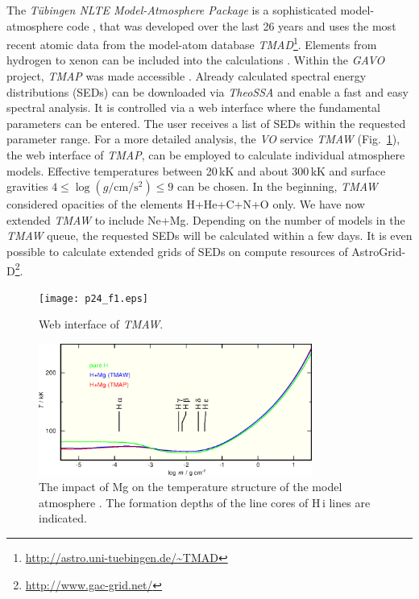 \documentclass[11pt,twoside]{article}
\begin{document}
The \emph{T\"ubingen NLTE Model-Atmosphere Package} 
\citep[\emph{TMAP},][]{werneretal2003, rauchdeetjen2003} is a 
sophisticated model-atmosphere code 
\citep[e.g\@.][]{rauchetal2007},
that was developed over the last 26 years 
and uses the most recent atomic data from the model-atom database
\emph{TMAD}\footnote[1]{\url{http://astro.uni-tuebingen.de/~TMAD}}.
Elements from hydrogen to xenon can be included into the calculations 
\citep{rauch2003,werneretal2012,rauchetal2012}. 
Within the \emph{GAVO} project, \emph{TMAP} was made accessible \citep{rauchringat2011}.
Already calculated spectral energy distributions
(SEDs) can be downloaded via \emph{TheoSSA} and enable a fast and 
easy spectral analysis. It is controlled via a web interface where the fundamental 
parameters can be entered. The user receives a list of SEDs within the requested 
parameter range. For a more detailed analysis, the \emph{VO} service \emph{TMAW} (Fig.~\ref{fig:tmaw}), the 
web interface of \emph{TMAP}, can be employed to calculate individual atmosphere models. 
Effective temperatures between 20\,kK and about 300\,kK and surface gravities
$4 \leq \log (g / \mathrm{cm/s^2}) \leq 9$ can be chosen.
In the beginning,  \emph{TMAW} considered opacities of the elements H+He+C+N+O only.
We have now extended \emph{TMAW} to include Ne+Mg.
Depending on the number of models in the \emph{TMAW} queue, the requested SEDs 
will be calculated within a few days. It is even possible to calculate
extended grids of SEDs on compute resources of AstroGrid-D\footnote[2]{\url{http://www.gac-grid.net/}}.


\begin{landscape}
\begin{figure}[ht!]\centering
\texttt{[image: p24\_f1.eps]}
\caption{Web interface of \emph{TMAW}.}
\label{fig:tmaw}
\end{figure}
\end{landscape}


\begin{figure}[ht!]\centering
\includegraphics[width=0.8\textwidth]{p24_f2.eps}
\caption{The impact of Mg on the temperature structure of the model atmosphere
         \citep[$T_\mathrm{eff}=60\,\mathrm{kK}$, $\log g = 7$, solar abundances,][]{asplundetal2009}.
         The formation depths of the line cores of H\,{\sc i} lines are indicated.}
\label{fig:Tstruc}
\end{figure}
\end{document}
